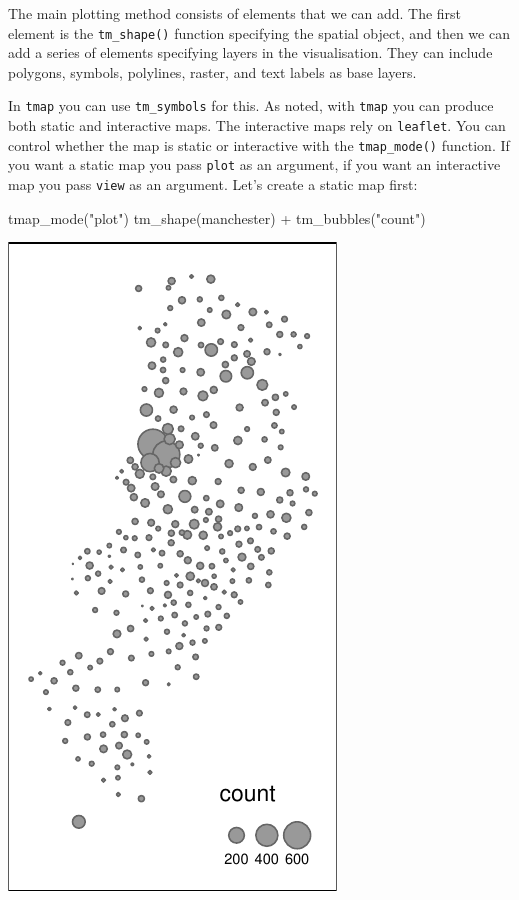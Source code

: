 \documentclass[
]{book}
\makeatletter
\newenvironment{Shaded}{\begin{snugshade}}{\end{snugshade}}
\newcommand{\FunctionTok}[1]{\textcolor[rgb]{0,0,0}{#1}}
\newcommand{\NormalTok}[1]{#1}
\newcommand{\SpecialCharTok}[1]{\textcolor[rgb]{0,0,0}{#1}}
\newcommand{\StringTok}[1]{\textcolor[rgb]{0.5,0.5,0.5}{#1}}
\newenvironment{kframe}{%
\medskip{}
\setlength{\fboxsep}{.8em}
 \def\at@end@of@kframe{}%
 \ifinner\ifhmode%
  \def\at@end@of@kframe{\end{minipage}}%
  \begin{minipage}{\columnwidth}%
 \fi\fi%
 \def\FrameCommand##1{\hskip\@totalleftmargin \hskip-\fboxsep
 \colorbox{shadecolor}{##1}\hskip-\fboxsep
     \hskip-\linewidth \hskip-\@totalleftmargin \hskip\columnwidth}%
 \MakeFramed {\advance\hsize-\width
   \@totalleftmargin\z@ \linewidth\hsize
   \@setminipage}}%
 {\par\unskip\endMakeFramed%
 \at@end@of@kframe}
\renewenvironment{Shaded}{\begin{kframe}}{\end{kframe}}
\makeatother
\begin{document}
The main plotting method consists of elements that we can add. The first element is the \texttt{tm\_shape()} function specifying the spatial object, and then we can add a series of elements specifying layers in the visualisation. They can include polygons, symbols, polylines, raster, and text labels as base layers.

In \texttt{tmap} you can use \texttt{tm\_symbols} for this. As noted, with \texttt{tmap} you can produce both static and interactive maps. The interactive maps rely on \texttt{leaflet}. You can control whether the map is static or interactive with the \texttt{tmap\_mode()} function. If you want a static map you pass \texttt{plot} as an argument, if you want an interactive map you pass \texttt{view} as an argument. Let's create a static map first:

\begin{Shaded}
\begin{Highlighting}[]
\FunctionTok{tmap\_mode}\NormalTok{(}\StringTok{"plot"}\NormalTok{)}
\FunctionTok{tm\_shape}\NormalTok{(manchester) }\SpecialCharTok{+} 
  \FunctionTok{tm\_bubbles}\NormalTok{(}\StringTok{"count"}\NormalTok{)}
\end{Highlighting}
\end{Shaded}

\includegraphics{crime_mapping_files/figure-latex/unnamed-chunk-78-1.pdf}
\end{document}
